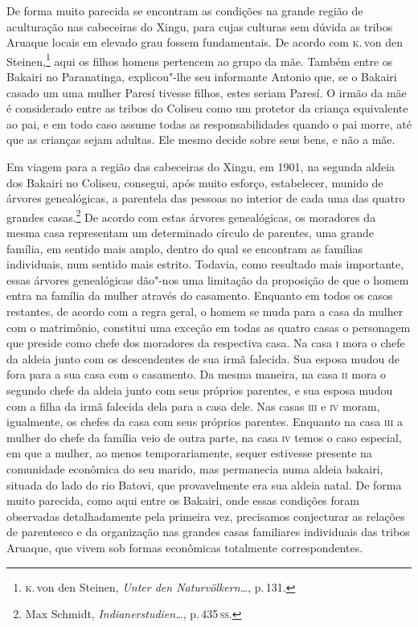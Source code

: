 De forma muito parecida se encontram as condições na grande região de
aculturação nas cabeceiras do Xingu, para cujas culturas sem dúvida as
tribos Aruaque locais em elevado grau fossem fundamentais. De acordo com
\textsc{k}.\,von den Steinen,\footnote{\textsc{k}.\,von den Steinen, \textit{Unter den Naturvölkern\ldots}, p.\,131.} aqui os filhos homens
pertencem ao grupo da mãe. Também entre os Bakairi no Paranatinga,
explicou"-lhe seu informante Antonio que, se o Bakairi casado um uma
mulher Paresí tivesse filhos, estes seriam Paresí. O irmão da mãe é
considerado entre as tribos do Coliseu como um protetor da criança
equivalente ao pai, e em todo caso assume todas as responsabilidades
quando o pai morre, até que as crianças sejam adultas. Ele mesmo decide sobre
seus bens, e não a mãe.

Em viagem para a região das cabeceiras do Xingu, em 1901, na
segunda aldeia dos Bakairi no Coliseu, consegui, após muito esforço,
estabelecer, munido de árvores genealógicas, a parentela das pessoas no
interior de cada uma das quatro grandes casas.\footnote{Max Schmidt,
  \textit{Indianerstudien\ldots}, p.\,435\,\textsc{ss}.} De acordo com
estas árvores genealógicas, os moradores da mesma casa representam um
determinado círculo de parentes, uma grande família, em sentido mais
amplo, dentro do qual se encontram as famílias individuais, num sentido
mais estrito. Todavia, como resultado mais importante, essas árvores
genealógicas dão"-nos uma limitação da proposição de que o homem entra
na família da mulher através do casamento. Enquanto em todos os casos
restantes, de acordo com a regra geral, o homem se muda para a casa da
mulher com o matrimônio, constitui uma exceção em todas as quatro casas
o personagem que preside como chefe dos moradores da respectiva casa. Na
casa \textsc{i} mora o chefe da aldeia junto com os descendentes de sua irmã
falecida. Sua esposa mudou de fora para a sua casa com o casamento. Da
mesma maneira, na casa \textsc{ii} mora o segundo chefe da aldeia junto com seus
próprios parentes, e sua esposa mudou com a filha da irmã falecida dela
para a casa dele. Nas casas \textsc{iii} e \textsc{iv} moram, igualmente, os chefes da
casa com seus próprios parentes. Enquanto na casa \textsc{iii} a mulher do chefe
da família veio de outra parte, na casa \textsc{iv} temos o caso especial, em que
a mulher, ao menos temporariamente, sequer estivesse presente na
comunidade econômica do seu marido, mas permanecia numa aldeia bakairi,
situada do lado do rio Batovi, que provavelmente era sua aldeia natal.
De forma muito parecida, como aqui entre os Bakairi, onde essas
condições foram observadas detalhadamente pela primeira vez, precisamos
conjecturar as relações de parentesco e da organização nas grandes casas
familiares individuais das tribos Aruaque, que vivem sob formas
econômicas totalmente correspondentes. 

